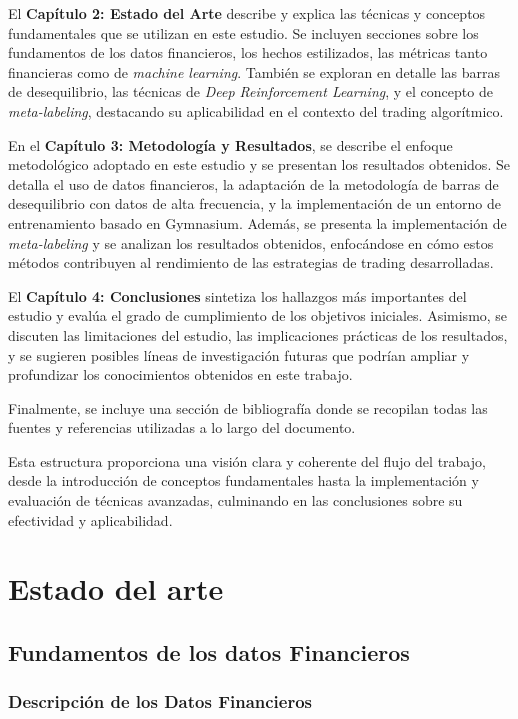\documentclass[a4paper,12pt, twoside]{report}
\begin{document}
El \textbf{Capítulo 2: Estado del Arte} describe y explica las técnicas y conceptos fundamentales 
que se utilizan en este estudio. Se incluyen secciones sobre los fundamentos de los datos financieros, 
los hechos estilizados, las métricas tanto financieras como de \textit{machine learning}. También 
se exploran en detalle las barras de desequilibrio, las técnicas de \textit{Deep Reinforcement Learning}, 
y el concepto de \textit{meta-labeling}, destacando su aplicabilidad en el contexto del trading algorítmico.

En el \textbf{Capítulo 3: Metodología y Resultados}, se describe el enfoque metodológico adoptado en este estudio y 
se presentan los resultados obtenidos. Se detalla el uso de datos financieros, la adaptación de 
la metodología de barras de desequilibrio con datos de alta frecuencia, y la implementación 
de un entorno de entrenamiento basado en Gymnasium. Además, se presenta la implementación 
de \textit{meta-labeling} y se analizan los resultados obtenidos, enfocándose en cómo estos 
métodos contribuyen al rendimiento de las estrategias de trading desarrolladas.

El \textbf{Capítulo 4: Conclusiones} sintetiza los hallazgos más importantes del estudio y evalúa 
el grado de cumplimiento de los objetivos iniciales. Asimismo, se discuten las limitaciones del estudio, 
las implicaciones prácticas de los resultados, y se sugieren posibles líneas de investigación futuras 
que podrían ampliar y profundizar los conocimientos obtenidos en este trabajo.

Finalmente, se incluye una sección de bibliografía donde se recopilan todas las fuentes y referencias 
utilizadas a lo largo del documento.

Esta estructura proporciona una visión clara y coherente del flujo del trabajo, desde la 
introducción de conceptos fundamentales hasta la implementación y evaluación de técnicas avanzadas, 
culminando en las conclusiones sobre su efectividad y aplicabilidad.

\chapter{Estado del arte}

\section{Fundamentos de los datos Financieros}
\subsection{Descripción de los Datos Financieros}
\end{document}
